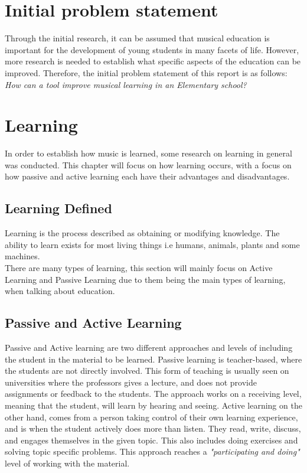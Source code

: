 \section{Initial problem statement}
Through the initial research, it can be assumed that musical education is important for the development of young students in many facets of life. However, more research is needed to establish what specific aspects of the education can be improved. Therefore, the initial problem statement of this report is as follows:\\ 

\textit{How can a tool improve musical learning in an Elementary school?}

\section{Learning}

In order to establish how music is learned, some research on learning in general was conducted. This chapter will focus on how learning occurs, with a focus on how passive and active learning each have their advantages and disadvantages.

\subsection{Learning Defined}\label{sec:learning}
Learning is the process described as obtaining or modifying knowledge\cite{wikiLearn}. The ability to learn exists for most living things i.e humans, animals, plants and some machines\cite{wikiLearn}. \\

There are many types of learning, this section will mainly focus on Active Learning and Passive Learning due to them being the main types of learning, when talking about education\cite{wikiLearn}.

\subsection*{Passive and Active Learning}\label{sec:activeLearning}
Passive and Active learning are two different approaches and levels of including the student in the material to be learned. 
Passive learning is teacher-based, where the students are not directly involved\cite{activelearning}. This form of teaching is usually seen on universities where the professors gives a lecture, and does not provide assignments or feedback to the students. The approach works on a receiving level, meaning that the student, will learn by hearing and seeing\cite{activelearning}.  
Active learning on the other hand, comes from a person taking control of their own learning experience, and is when the student actively does more than listen\cite{activelearning}. They read, write, discuss, and engages themselves in the given topic. This also includes doing exercises and solving topic specific problems\cite{activelearning}. This approach reaches a \textit{"participating and doing"} level of working with the material. 

